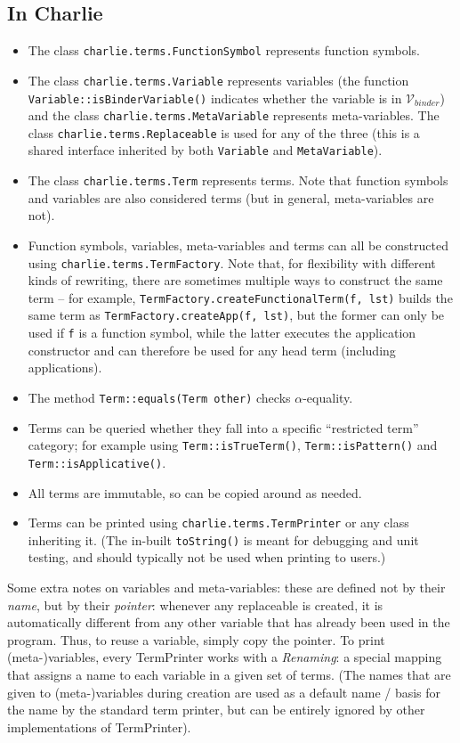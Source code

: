 \documentclass{lmcs}
\theoremstyle{theorem}\newtheorem{theorem}{Theorem}
\theoremstyle{theorem}\newtheorem{lemma}[theorem]{Lemma}
\theoremstyle{theorem}\newtheorem{corollary}[theorem]{Corollary}
\theoremstyle{definition}\newtheorem{definition}[theorem]{Definition}
\theoremstyle{definition}\newtheorem{example}[theorem]{Example}
\newcommand{\Vbound}{\mathcal{V}_{\mathit{binder}}}
\begin{document}
\subsection*{In Charlie}

\begin{itemize}
\item The class \texttt{charlie.terms.FunctionSymbol} represents function
  symbols.
\item The class \texttt{charlie.terms.Variable} represents variables
  (the function \texttt{Variable::isBinderVariable()} indicates whether the
  variable is in $\Vbound$) and the class \texttt{charlie.terms.MetaVariable}
  represents meta-variables.  The class \texttt{charlie.terms.Replaceable}
  is used for any of the three (this is a shared interface inherited by both
  \texttt{Variable} and \texttt{MetaVariable}).
\item The class \texttt{charlie.terms.Term} represents terms.  Note that
  function symbols and variables are also considered terms (but in general,
  meta-variables are not).
\item Function symbols, variables, meta-variables and terms can all be
  constructed using \texttt{charlie.terms.TermFactory}.  Note that, for
  flexibility with different kinds of rewriting, there are sometimes multiple
  ways to construct the same term -- for example,
  \texttt{TermFactory.createFunctionalTerm(f, lst)} builds the same term as
  \texttt{TermFactory.createApp(f, lst)}, but the former can only be used if
  \texttt{f} is a function symbol, while the latter executes the application
  constructor and can therefore be used for any head term (including
  applications).
\item The method \texttt{Term::equals(Term other)} checks $\alpha$-equality.
\item Terms can be queried whether they fall into a specific ``restricted term''
  category; for example using \texttt{Term::isTrueTerm()},
  \texttt{Term::isPattern()} and \texttt{Term::isApplicative()}.
\item All terms are immutable, so can be copied around as needed.
\item Terms can be printed using \texttt{charlie.terms.TermPrinter} or any class
  inheriting it.
  (The in-built \texttt{toString()} is meant for debugging and unit testing, and
  should typically not be used when printing to users.)
\end{itemize}

\medskip
Some extra notes on variables and meta-variables: these are defined not by their
\emph{name}, but by their \emph{pointer}: whenever any replaceable is created,
it is automatically different from any other variable that has already been
used in the program.  Thus, to reuse a variable, simply copy the pointer.  To
print (meta-)variables, every TermPrinter works with a \emph{Renaming}: a
special mapping that assigns a name to each variable in a given set of terms.
(The names that are given to (meta-)variables during creation are used as a
default name / basis for the name by the standard term printer, but can be
entirely ignored by other implementations of TermPrinter).
\end{document}
